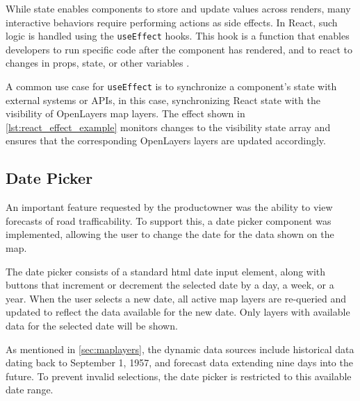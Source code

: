 \begin{figure}[h]

\end{figure}

While state enables components to store and update values across renders, many interactive behaviors require performing actions as side effects. In React, such logic is handled using the \texttt{useEffect} hooks. This hook is a function that enables developers to run specific code after the component has rendered, and to react to changes in props, state, or other variables \cite{react_useEffect}.

A common use case for \texttt{useEffect} is to synchronize a component's state with external systems or APIs, in this case, synchronizing React state with the visibility of OpenLayers map layers. The effect shown in \autoref{lst:react_effect_example} monitors changes to the visibility state array and ensures that the corresponding OpenLayers layers are updated accordingly.

\begin{figure}[h]

\end{figure}

\subsection{Date Picker}

An important feature requested by the \gls{productowner} was the ability to view forecasts of road trafficability. To support this, a date picker component was implemented, allowing the user to change the date for the data shown on the map.

The date picker consists of a standard \acrshort{html} date input element, along with buttons that increment or decrement the selected date by a day, a week, or a year. When the user selects a new date, all active map layers are re-queried and updated to reflect the data available for the new date. Only layers with available data for the selected date will be shown.

As mentioned in \autoref{sec:maplayers}, the dynamic data sources include historical data dating back to September 1, 1957, and forecast data extending nine days into the future. To prevent invalid selections, the date picker is restricted to this available date range.

